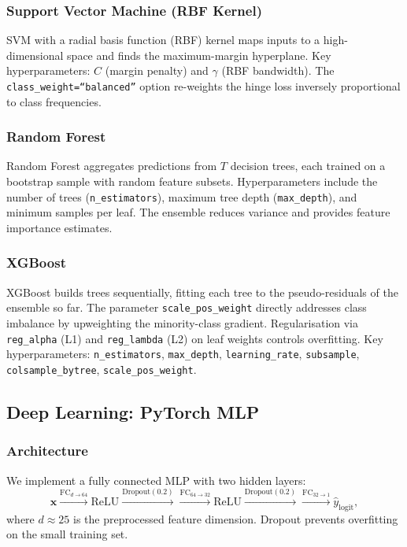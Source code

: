 \documentclass[11pt,a4paper]{article}
\begin{document}
\subsubsection{Support Vector Machine (RBF Kernel)}
SVM with a radial basis function (RBF) kernel maps inputs to a high-dimensional space and finds the maximum-margin hyperplane.
Key hyperparameters: $C$ (margin penalty) and $\gamma$ (RBF bandwidth).
The \texttt{class\_weight=``balanced''} option re-weights the hinge loss inversely proportional to class frequencies.

\subsubsection{Random Forest}
Random Forest aggregates predictions from $T$ decision trees, each trained on a bootstrap sample with random feature subsets.
Hyperparameters include the number of trees (\texttt{n\_estimators}), maximum tree depth (\texttt{max\_depth}), and minimum samples per leaf.
The ensemble reduces variance and provides feature importance estimates.

\subsubsection{XGBoost}
XGBoost builds trees sequentially, fitting each tree to the pseudo-residuals of the ensemble so far.
The parameter \texttt{scale\_pos\_weight} directly addresses class imbalance by upweighting the minority-class gradient.
Regularisation via \texttt{reg\_alpha} (L1) and \texttt{reg\_lambda} (L2) on leaf weights controls overfitting.
Key hyperparameters: \texttt{n\_estimators}, \texttt{max\_depth}, \texttt{learning\_rate}, \texttt{subsample}, \texttt{colsample\_bytree}, \texttt{scale\_pos\_weight}.

\subsection{Deep Learning: PyTorch MLP}

\subsubsection{Architecture}

We implement a fully connected MLP with two hidden layers:
\[
  \mathbf{x}
  \xrightarrow{\text{FC}_{d\to64}}
  \text{ReLU}
  \xrightarrow{\text{Dropout}(0.2)}
  \xrightarrow{\text{FC}_{64\to32}}
  \text{ReLU}
  \xrightarrow{\text{Dropout}(0.2)}
  \xrightarrow{\text{FC}_{32\to1}}
  \hat{y}_{\text{logit}},
\]
where $d \approx 25$ is the preprocessed feature dimension.
Dropout prevents overfitting on the small training set.
\end{document}

